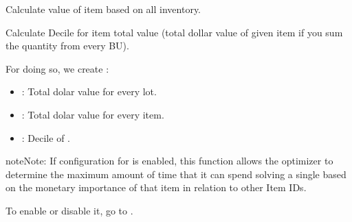\documentclass[letterpaper,10pt,english]{sphinxmanual}
\begin{document}
\begin{fulllineitems}
\label{\detokenize{source/optimization.datatools:optimization.datatools.dataprep.item_value_importance}}
Calculate value of item based on all inventory.

Calculate Decile for item total value
(total dollar value of given item if you sum the quantity from every BU).

For doing so, we create :
\begin{itemize}
\item {} 
: Total dolar value for every lot.

\item {} 
: Total dolar value for every item.

\item {} 
: Decile of .

\end{itemize}

\begin{sphinxadmonition}{note}{Note:}
If configuration for  is enabled, this function
allows the optimizer to determine the maximum amount of time that it can spend solving
a single  based on the monetary importance of that item in relation to other Item IDs.

To enable or disable it, go to .
\end{sphinxadmonition}

\end{fulllineitems}

\end{document}

